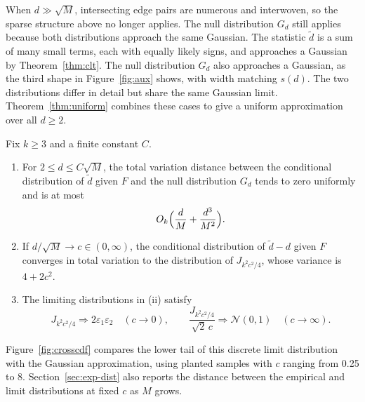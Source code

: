 When $d\gg\sqrt M$, intersecting edge pairs are numerous and interwoven, so the sparse structure above no longer applies. The null distribution $G_d$ still applies because both distributions approach the same Gaussian. The statistic $\widetilde d$ is a sum of many small terms, each with equally likely signs, and approaches a Gaussian by Theorem~\ref{thm:clt}. The null distribution $G_d$ also approaches a Gaussian, as the third shape in Figure~\ref{fig:aux} shows, with width matching $s(d)$. The two distributions differ in detail but share the same Gaussian limit. Theorem~\ref{thm:uniform} combines these cases to give a uniform approximation over all $d\ge2$.

\begin{theorem}\label{thm:cross}
Fix $k\ge3$ and a finite constant $C$.
\begin{enumerate}[label=(\roman*)]
\item For $2\le d\le C\sqrt M$, the total variation distance between the conditional distribution of $\widetilde d$ given $F$ and the null distribution $G_d$ tends to zero uniformly and is at most
\begin{equation}
O_k\Bigl(\frac dM+\frac{d^3}{M^2}\Bigr).\label{eq:tv-error}
\end{equation}
\item If $d/\sqrt M\to c\in(0,\infty)$, the conditional distribution of $\widetilde d-d$ given $F$ converges in total variation to the distribution of $J_{k^2c^2/4}$, whose variance is $4+2c^2$.
\item The limiting distributions in (ii) satisfy
\begin{equation*}
J_{k^2c^2/4}\Rightarrow2\varepsilon_1\varepsilon_2\quad(c\to0),\qquad\frac{J_{k^2c^2/4}}{\sqrt2\,c}\Rightarrow\mathcal N(0,1)\quad(c\to\infty).
\end{equation*}
\end{enumerate}
\end{theorem}

Figure~\ref{fig:crosscdf} compares the lower tail of this discrete limit distribution with the Gaussian approximation, using planted samples with $c$ ranging from 0.25 to 8. Section~\ref{sec:exp-dist} also reports the distance between the empirical and limit distributions at fixed $c$ as $M$ grows.

